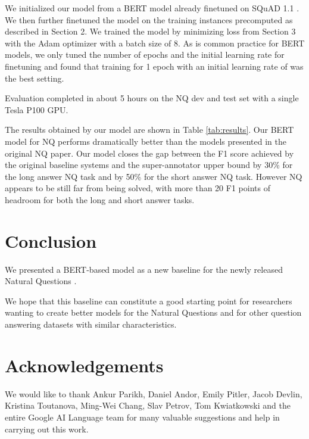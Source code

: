 \documentclass[11pt,a4paper]{article}
\begin{document}
We initialized our model from a BERT model already finetuned on SQuAD 1.1 \cite{rajpurkar2016squad}. We then further finetuned the model on the training instances precomputed as described in Section 2. We trained the model by minimizing loss  from Section 3 with the Adam optimizer \cite{kingma2014adam} with a batch size of 8. As is common practice for BERT models, we only tuned the number of epochs and the initial learning rate for finetuning and found that training for 1 epoch with an initial learning rate of  was the best setting.

Evaluation completed in about 5 hours on the NQ dev and test set with a single Tesla P100 GPU. 

The results obtained by our model are shown in Table \ref{tab:results}. Our BERT model for NQ performs dramatically better than the models presented in the original NQ paper. Our model closes the gap between the F1 score achieved by the original baseline systems and the super-annotator upper bound by 30\% for the long answer NQ task and by 50\% for the short answer NQ task. However NQ appears to be still far from being solved, with more than 20 F1 points of headroom for both the long and short answer tasks.

\section{Conclusion}
We presented a BERT-based model \cite{devlin2018bert} as a new baseline for the newly released Natural Questions \cite{kwiatkowski2019nq}.

We hope that this baseline can constitute a good starting point for researchers wanting to create better models for the Natural Questions and for other question answering datasets with similar characteristics.

\section{Acknowledgements}
We would like to thank Ankur Parikh, Daniel Andor, Emily Pitler, Jacob Devlin, Kristina Toutanova, Ming-Wei Chang, Slav Petrov, Tom Kwiatkowski and the entire Google AI Language team for many valuable suggestions and help in carrying out this work.



\end{document}
